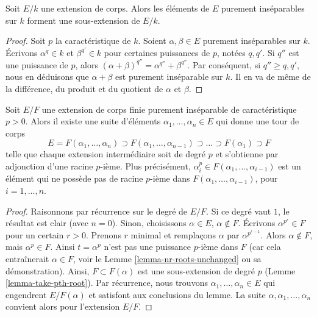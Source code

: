 \begin{lemma}
\label{lemma-purely-inseparable-elements}
Soit $E/k$ une extension de corps. Alors les éléments de $E$ purement inséparables
sur $k$ forment une sous-extension de $E/k$.
\end{lemma}

\begin{proof}
Soit $p$ la caractéristique de $k$.
Soient $\alpha, \beta \in E$ purement inséparables sur $k$. Écrivons
$\alpha^q \in k$ et $\beta^{q'} \in k$ pour certaines puissances de $p$, notées $q, q'$.
Si $q''$ est une puissance de $p$, alors
$(\alpha + \beta)^{q''} = \alpha^{q''} + \beta^{q''}$.
Par conséquent, si $q'' \geq q, q'$, nous en déduisons que $\alpha + \beta$
est purement inséparable sur $k$. Il en va de même de la différence,
du produit et du quotient de $\alpha$ et $\beta$.
\end{proof}

\begin{lemma}
\label{lemma-finite-purely-inseparable}
Soit $E/F$ une extension de corps finie purement inséparable de
caractéristique $p > 0$. Alors il existe une suite d'éléments
$\alpha_1, \ldots, \alpha_n \in E$ qui donne une tour
de corps
$$
E = F(\alpha_1, \ldots, \alpha_n) \supset
F(\alpha_1, \ldots, \alpha_{n - 1}) \supset
\ldots
\supset F(\alpha_1) \supset F
$$
telle que chaque extension intermédiaire soit de degré $p$ et s'obtienne
par adjonction d'une racine $p$-ième. Plus précisément,
$\alpha_i^p \in F(\alpha_1, \ldots, \alpha_{i - 1})$
est un élément qui ne possède pas de racine $p$-ième dans
$F(\alpha_1, \ldots, \alpha_{i - 1})$, pour $i = 1, \ldots, n$.
\end{lemma}

\begin{proof}
Raisonnons par récurrence sur le degré de $E/F$. Si ce degré vaut $1$,
le résultat est clair (avec $n = 0$). Sinon, choisissons
$\alpha \in E$, $\alpha \not \in F$. Écrivons $\alpha^{p^r} \in F$ pour un certain
$r > 0$. Prenons $r$ minimal et remplaçons $\alpha$ par $\alpha^{p^{r - 1}}$.
Alors $\alpha \not \in F$, mais $\alpha^p \in F$. Ainsi $t = \alpha^p$ n'est pas
une puissance $p$-ième dans $F$ (car cela entraînerait $\alpha \in F$, voir le
Lemme \ref{lemma-nr-roots-unchanged} ou sa démonstration).
Ainsi, $F \subset F(\alpha)$ est une sous-extension de degré $p$
(Lemme \ref{lemma-take-pth-root}). Par récurrence, nous trouvons
$\alpha_1, \ldots, \alpha_n \in E$ qui engendrent $E/F(\alpha)$
et satisfont aux conclusions du lemme.
La suite $\alpha, \alpha_1, \ldots, \alpha_n$ convient alors
pour l'extension $E/F$.
\end{proof}

